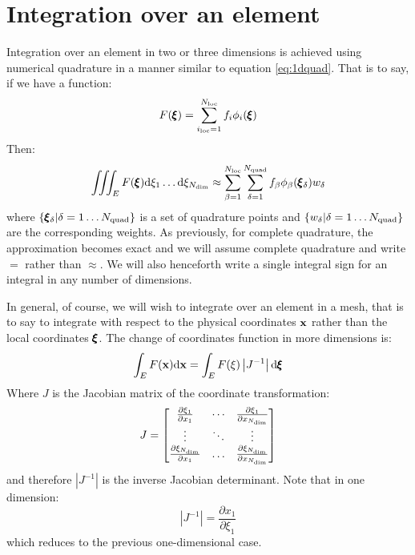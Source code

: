\documentclass[a4paper, 11pt]{book}
\begin{document}
\section{Integration over an element}\label{sec:quadrature}

Integration over an element in two or three dimensions is achieved using
numerical quadrature in a manner similar to equation \eqref{eq:1dquad}. That
is to say, if we have a function:
\begin{equation}
  F(\pmb{\xi})=\sum_{{i_\mathrm{loc}}=1}^{N_\mathrm{loc}}f_i\phi_i(\pmb{\xi})
\end{equation}
Then:
\begin{equation}
  \iiint_E F(\pmb{\xi})\mathrm{d}\xi_1\ldots\mathrm{d}\xi_{N_\mathrm{dim}}
  \approx \sum_{\beta=1}^{N_\mathrm{loc}}\sum_{\delta=1}^{N_\mathrm{quad}} f_\beta\phi_\beta(\pmb{\xi}_\delta)w_\delta
\end{equation}
where $\{\pmb{\xi}_\delta|\delta=1\ldots N_\mathrm{quad}\}$ is a set of quadrature points
and $\{w_\delta|\delta=1\ldots N_\mathrm{quad}\}$ are the corresponding weights. As
previously, for complete quadrature, the approximation becomes exact and we
will assume complete quadrature and write $=$ rather than $\approx$. We will
also henceforth write a single integral sign for an integral in any number
of dimensions.

In general, of course, we will wish to integrate over an element in a mesh,
that is to say to integrate with respect to the physical coordinates $\mathbf{x}$
rather than the local coordinates $\pmb{\xi}$. The change of coordinates
function in more dimensions is:
\begin{equation}
  \int_E F(\mathbf{x}) \mathrm{d}\mathbf{x} = \int_E F(\xi) \left|J^{-1}\right|\mathrm{d}\pmb{\xi}
\end{equation}
Where $J$ is the Jacobian matrix of the coordinate transformation:
\begin{equation}
  J=
  \begin{bmatrix}
    \frac{\partial\xi_1}{\partial x_1} & \cdots &
    \frac{\partial\xi_1}{\partial x_{N_\mathrm{dim}}}\\
    \vdots & \ddots & \vdots\\
    \frac{\partial\xi_{N_\mathrm{dim}}}{\partial x_1} & \ldots & \frac{\partial\xi_{N_\mathrm{dim}}}{\partial x_{N_\mathrm{dim}}}
  \end{bmatrix}
\end{equation}
and therefore $\left|J^{-1}\right|$ is the inverse Jacobian
determinant. Note that in one dimension:
\begin{equation}
  \left|J^{-1}\right|=\frac{\partial x_1}{\partial\xi_1}
\end{equation}
which reduces to the previous one-dimensional case.
\end{document}
